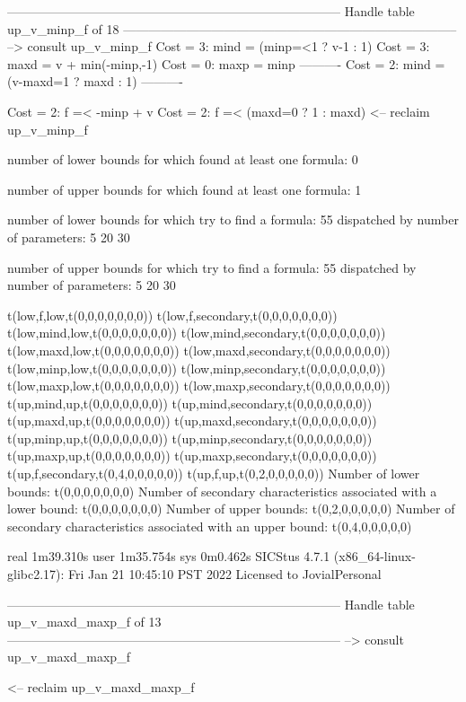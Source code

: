 --------------------------------------------------------------------------------
Handle table up_v_minp_f of 18
--------------------------------------------------------------------------------
--> consult up_v_minp_f
Cost =  3:  mind = (minp=<1 ? v-1 : 1)
Cost =  3:  maxd = v + min(-minp,-1) %
Cost =  0:  maxp = minp
----------
Cost =  2:  mind = (v-maxd=1 ? maxd : 1)
----------

Cost =  2:  f =< -minp + v
Cost =  2:  f =< (maxd=0 ? 1 : maxd)
<-- reclaim up_v_minp_f

number of lower bounds for which found at least one formula: 0

number of upper bounds for which found at least one formula: 1

number of lower bounds for which try to find a formula: 55
dispatched by number of parameters: 5  20  30

number of upper bounds for which try to find a formula: 55
dispatched by number of parameters: 5  20  30

t(low,f,low,t(0,0,0,0,0,0,0))
t(low,f,secondary,t(0,0,0,0,0,0,0))
t(low,mind,low,t(0,0,0,0,0,0,0))
t(low,mind,secondary,t(0,0,0,0,0,0,0))
t(low,maxd,low,t(0,0,0,0,0,0,0))
t(low,maxd,secondary,t(0,0,0,0,0,0,0))
t(low,minp,low,t(0,0,0,0,0,0,0))
t(low,minp,secondary,t(0,0,0,0,0,0,0))
t(low,maxp,low,t(0,0,0,0,0,0,0))
t(low,maxp,secondary,t(0,0,0,0,0,0,0))
t(up,mind,up,t(0,0,0,0,0,0,0))
t(up,mind,secondary,t(0,0,0,0,0,0,0))
t(up,maxd,up,t(0,0,0,0,0,0,0))
t(up,maxd,secondary,t(0,0,0,0,0,0,0))
t(up,minp,up,t(0,0,0,0,0,0,0))
t(up,minp,secondary,t(0,0,0,0,0,0,0))
t(up,maxp,up,t(0,0,0,0,0,0,0))
t(up,maxp,secondary,t(0,0,0,0,0,0,0))
t(up,f,secondary,t(0,4,0,0,0,0,0))
t(up,f,up,t(0,2,0,0,0,0,0))
Number of lower bounds:                                             t(0,0,0,0,0,0,0)
Number of secondary characteristics associated with a lower bound:  t(0,0,0,0,0,0,0)
Number of upper bounds:                                             t(0,2,0,0,0,0,0)
Number of secondary characteristics associated with an upper bound: t(0,4,0,0,0,0,0)

real	1m39.310s
user	1m35.754s
sys	0m0.462s
SICStus 4.7.1 (x86_64-linux-glibc2.17): Fri Jan 21 10:45:10 PST 2022
Licensed to JovialPersonal


--------------------------------------------------------------------------------
Handle table up_v_maxd_maxp_f of 13
--------------------------------------------------------------------------------
--> consult up_v_maxd_maxp_f

<-- reclaim up_v_maxd_maxp_f

